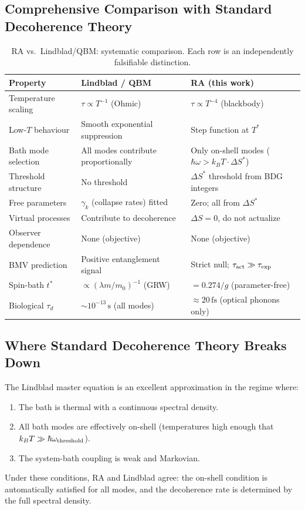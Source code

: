 \documentclass[12pt,a4paper]{article}
\begin{document}
\subsection{Comprehensive Comparison with Standard Decoherence Theory}

\begin{table}[ht]
\centering
\caption{RA vs.\ Lindblad/QBM: systematic comparison.  Each row is an independently falsifiable distinction.}
\label{tab:comparison}
\begin{tabular}{p{4.2cm}p{4.8cm}p{4.8cm}}
\toprule
Property & Lindblad / QBM & RA (this work) \\
\midrule
Temperature scaling & $\tau\propto T^{-1}$ (Ohmic) & $\tau\propto T^{-4}$ (blackbody) \\[2pt]
Low-$T$ behaviour & Smooth exponential suppression & Step function at $T^*$ \\[2pt]
Bath mode selection & All modes contribute proportionally & Only on-shell modes ($\hbar\omega>k_BT\cdot\Delta S^*$) \\[2pt]
Threshold structure & No threshold & $\Delta S^*$ threshold from BDG integers \\[2pt]
Free parameters & $\gamma_k$ (collapse rates) fitted & Zero; all from $\Delta S^*$ \\[2pt]
Virtual processes & Contribute to decoherence & $\Delta S=0$, do not actualize \\[2pt]
Observer dependence & None (objective) & None (objective) \\[2pt]
BMV prediction & Positive entanglement signal & Strict null; $\tau_{\rm act}\gg\tau_{\rm exp}$ \\[2pt]
Spin-bath $t^*$ & $\propto(\lambda m/m_0)^{-1}$ (GRW) & $=0.274/g$ (parameter-free) \\[2pt]
Biological $\tau_d$ & $\sim10^{-13}\,\mathrm{s}$ (all modes) & $\approx20\,\mathrm{fs}$ (optical phonons only) \\
\bottomrule
\end{tabular}
\end{table}

\subsection{Where Standard Decoherence Theory Breaks Down}

The Lindblad master equation is an excellent approximation in the regime where:
\begin{enumerate}
  \item The bath is thermal with a continuous spectral density.
  \item All bath modes are effectively on-shell (temperatures high enough that $k_BT\gg\hbar\omega_{\rm threshold}$).
  \item The system-bath coupling is weak and Markovian.
\end{enumerate}
Under these conditions, RA and Lindblad agree: the on-shell condition is automatically satisfied for all modes, and the decoherence rate is determined by the full spectral density.
\end{document}
